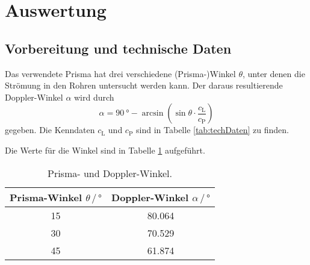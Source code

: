 \section{Auswertung}
\label{sec:Auswertung}

\subsection{Vorbereitung und technische Daten}

Das verwendete Prisma hat drei verschiedene (Prisma-)Winkel $\theta$, unter denen die Strömung in den Rohren untersucht werden kann. 
Der daraus resultierende Doppler-Winkel $\alpha$ wird durch 
\begin{equation*}
    \alpha=\SI{90}{\degree}-\arcsin (\sin \theta \cdot \frac{c_\text{L}}{c_\text{P}})
\end{equation*}
gegeben. Die Kenndaten $c_\text{L}$ und $c_\text{P}$ sind in Tabelle \ref{tab:techDaten} zu finden.

Die Werte für die Winkel sind in Tabelle \ref{tab:Winkel} aufgeführt.
\begin{table}
    \centering
    \caption{Prisma- und Doppler-Winkel.}
    \label{tab:Winkel}
    \begin{tabular}{c c}
        \toprule
        Prisma-Winkel $\theta \,/\,\si{\degree}$ & Doppler-Winkel $\alpha \,/\,\si{\degree}$ \\
        \midrule
        15 & 80.064 \\        
        30 & 70.529 \\
        45 & 61.874 \\        
        \bottomrule
    \end{tabular}
\end{table}

